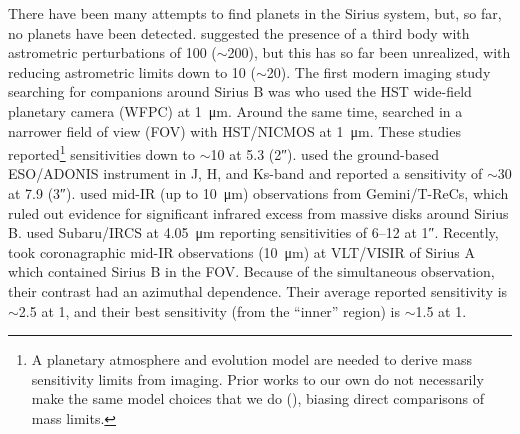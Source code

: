 \documentclass[twocolumn]{aastex631}
\begin{document}
There have been many attempts to find planets in the Sirius system, but, so far, no planets have been detected. \citet{benestSiriusTripleStar1995} suggested the presence of a third body with astrometric perturbations of \qty{100}{\milliarcsecond} ($\sim$\qty{200}{\jupitermass}), but this has so far been unrealized, with \citet{bondSiriusSystemIts2017} reducing astrometric limits down to \qty{10}{\milliarcsecond} ($\sim$\qty{20}{\jupitermass}). The first modern imaging study searching for companions around Sirius B was \citet{schroederSearchFaintCompanions2000} who used the HST wide-field planetary camera (WFPC) at \qty{1}{\micro\meter}. Around the same time, \citet{kuchnerSearchExozodiacalDust2000} searched in a narrower field of view (FOV) with HST/NICMOS at \qty{1}{\micro\meter}. These studies reported\footnote{A planetary atmosphere and evolution model are needed to derive mass sensitivity limits from imaging. Prior works to our own do not necessarily make the same model choices that we do (), biasing direct comparisons of mass limits.} sensitivities down to $\sim$\qty{10}{\jupitermass} at \qty{5.3}{\au} (\ang{;;2}).  \citet{bonnet-bidaudADONISHighContrast2008a} used the ground-based ESO/ADONIS instrument in J, H, and Ks-band and reported a sensitivity of $\sim$\qty{30}{\jupitermass} at \qty{7.9}{\au} (\ang{;;3}). \citet{skemerSiriusImagedMidinfrared2011} used mid-IR (up to \qty{10}{\micro\meter}) observations from Gemini/T-ReCs, which ruled out evidence for significant infrared excess from massive disks around Sirius B. \citet{thalmannPiercingGlareDirect2011} used Subaru/IRCS at \qty{4.05}{\micro\meter} reporting sensitivities of \qtyrange{6}{12}{\jupitermass} at \ang{;;1}. Recently, \citet{pathakHighContrastImaging2021} took coronagraphic mid-IR observations (\qty{10}{\micro\meter}) at VLT/VISIR of Sirius A which contained Sirius B in the FOV. Because of the simultaneous observation, their contrast had an azimuthal dependence. Their average reported sensitivity is $\sim$\qty{2.5}{\jupitermass} at \qty{1}{\au}, and their best sensitivity (from the ``inner'' region) is $\sim$\qty{1.5}{\jupitermass} at \qty{1}{\au}.
\end{document}
